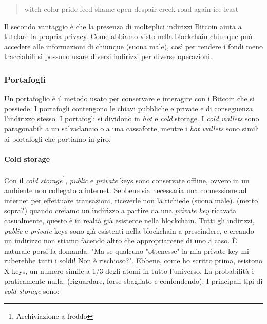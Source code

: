 \documentclass {article}
\begin{document}
\begin{quote}

witch color pride feed shame open despair creek road again ice least

\end{quote}
%
Il secondo vantaggio è che la presenza di molteplici indirizzi Bitcoin aiuta a tutelare la propria privacy.
Come abbiamo visto nella blockchain chiunque può accedere alle informazioni di chiunque (suona male), così per rendere i fondi meno tracciabili si possono usare diversi indirizzi per diverse operazioni.


\subsubsection {Portafogli}


Un portafoglio è il metodo usato per conservare e interagire con i Bitcoin che si possiede.
I portafogli contengono le chiavi pubbliche e private e di conseguenza l'indirizzo stesso.
I portafogli si dividono in \textit{hot} e \textit{cold} storage.
I \textit{cold wallets} sono paragonabili a un salvadanaio o a una cassaforte, mentre i \textit{hot wallets} sono simili ai portafogli che portiamo in giro.

\paragraph {Cold storage}

Con il \textit{cold storage}\footnote{Archiviazione a freddo}, \textit{public} e \textit{private} keys sono conservate offline, ovvero in un ambiente non collegato a internet.
Sebbene sia necessaria una connessione ad internet per effettuare transazioni, riceverle non la richiede (suona male).
(metto sopra?) quando creiamo un indirizzo a partire da una \textit{private key} ricavata casualmente, questo è in realtà già esistente nella blockchain.
Tutti gli indirizzi, \textit{public} e \textit{private} keys sono già esistenti nella blockchain a prescindere, e creando un indirizzo non stiamo facendo altro che appropriarcene di uno a caso.
È naturale porsi la domanda: "Ma se qualcuno "ottenesse" la mia private key mi ruberebbe tutti i soldi! Non è rischioso?".
Ebbene, come ho scritto prima, esistono X keys, un numero simile a 1/3 degli atomi in tutto l'universo. La probabilità è praticamente nulla. (riguardare, forse sbagliato e confondendo).
I principali tipi di \textit{cold storage} sono:
\end{document}
